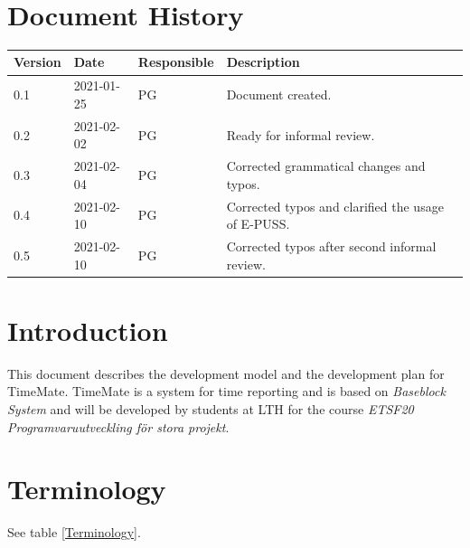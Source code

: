\documentclass{article}
\date {#1}
\title {
    \documentNumber {00}    %
    \documentVersion {0.5}
    \documentTitle {Software Development Plan}
    \documentGroup {2}
    \documentResponsible {Project Management Group}
    \documentAuthors {Project Management Group}
    \documentDate {2021-02-10}
}
\begin{document}
\maketitle
\thispagestyle{empty}

\newpage

\tableofcontents

\newpage

\section{Document History}
\begin{tabular}{ l | l | l | l }
    Version & Date & Responsible & Description \\
    \hline
    0.1 & 2021-01-25 & PG & Document created. \\
    0.2 & 2021-02-02 & PG & Ready for informal review. \\
    0.3 & 2021-02-04 & PG & Corrected grammatical changes and typos. \\
    0.4 & 2021-02-10 & PG & Corrected typos and clarified the usage of E-PUSS. \\
    0.5 & 2021-02-10 & PG & Corrected typos after second informal review. \\
\end{tabular}

\section{Introduction}
    This document describes the development model and the development plan for TimeMate.
    TimeMate is a system for time reporting and is based on \textit{Baseblock System} and will be developed by students at LTH for the course
    \textit{ETSF20 Programvaruutveckling för stora projekt}.

\section{Terminology}
    
    See table \ref{Terminology}.
    
\end{document}
